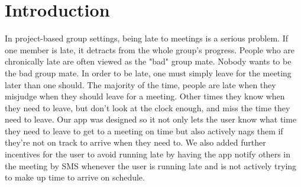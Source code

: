 \section{Introduction}
In project-based group settings, being late to meetings is a serious problem. If one member is late, it detracts from the whole group's progress. People who are chronically late are often viewed as the "bad" group mate. Nobody wants to be the bad group mate. In order to be late, one must simply leave for the meeting later than one should. The majority of the time, people are late when they misjudge when they should leave for a meeting. Other times they know when they need to leave, but don't look at the clock enough, and miss the time they need to leave. Our app was designed so it not only lets the user know what time they need to leave to get to a meeting on time but also actively nags them if they're not on track to arrive when they need to. We also added further incentives for the user to avoid running late by having the app notify others in the meeting by SMS whenever the user is running late and is not actively trying to make up time to arrive on schedule.
